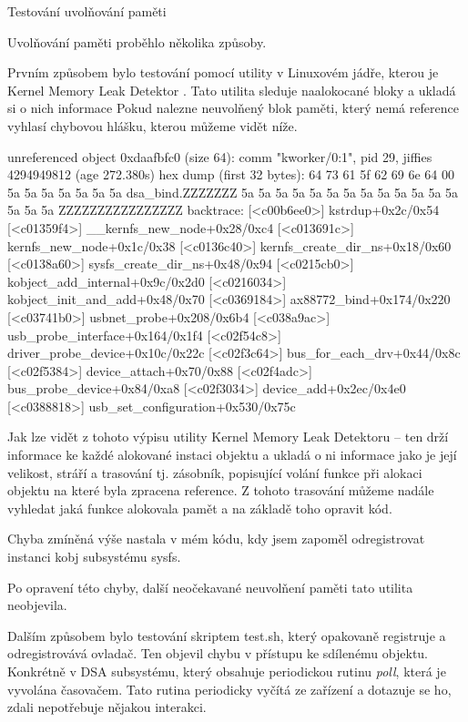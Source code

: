 \sec Testování uvolňování paměti

Uvolňování paměti proběhlo několika způsoby.

Prvním způsobem bylo testování pomocí utility v Linuxovém jádře, kterou je Kernel Memory Leak Detektor
.
Tato utilita sleduje naalokocané bloky a ukladá si o nich informace
Pokud nalezne neuvolňený blok paměti, který nemá reference vyhlasí chybovou hlášku, kterou můžeme vidět níže.

\begtt
unreferenced object 0xdaafbfc0 (size 64):
  comm "kworker/0:1", pid 29, jiffies 4294949812 (age 272.380s)
  hex dump (first 32 bytes):
    64 73 61 5f 62 69 6e 64 00 5a 5a 5a 5a 5a 5a 5a  dsa_bind.ZZZZZZZ
    5a 5a 5a 5a 5a 5a 5a 5a 5a 5a 5a 5a 5a 5a 5a 5a  ZZZZZZZZZZZZZZZZ
  backtrace:
    [<c00b6ee0>] kstrdup+0x2c/0x54
    [<c01359f4>] __kernfs_new_node+0x28/0xc4
    [<c013691c>] kernfs_new_node+0x1c/0x38
    [<c0136c40>] kernfs_create_dir_ns+0x18/0x60
    [<c0138a60>] sysfs_create_dir_ns+0x48/0x94
    [<c0215cb0>] kobject_add_internal+0x9c/0x2d0
    [<c0216034>] kobject_init_and_add+0x48/0x70
    [<c0369184>] ax88772_bind+0x174/0x220
    [<c03741b0>] usbnet_probe+0x208/0x6b4
    [<c038a9ac>] usb_probe_interface+0x164/0x1f4
    [<c02f54c8>] driver_probe_device+0x10c/0x22c
    [<c02f3c64>] bus_for_each_drv+0x44/0x8c
    [<c02f5384>] device_attach+0x70/0x88
    [<c02f4adc>] bus_probe_device+0x84/0xa8
    [<c02f3034>] device_add+0x2ec/0x4e0
    [<c0388818>] usb_set_configuration+0x530/0x75c
\endtt

Jak lze vidět z tohoto výpisu utility Kernel Memory Leak Detektoru -- ten drží informace ke každé alokované instaci objektu a ukladá o ni informace jako je její velikost, stráří a trasování tj. zásobník, popisující volání funkce při alokaci objektu na které byla zpracena reference.
Z tohoto trasování můžeme nadále vyhledat jaká funkce alokovala pamět a na základě toho opravit kód.

Chyba zmíněná výše nastala v mém kódu, kdy jsem zapoměl odregistrovat instanci kobj subsystému sysfs.

Po opravení této chyby, další neočekavané neuvolňení paměti tato utilita neobjevila.

Dalším způsobem bylo testování skriptem test.sh, který opakovaně registruje a odregistrovává ovladač.
Ten objevil chybu v přístupu ke sdílenému objektu.
Konkrétně v DSA subsystému, který obsahuje periodickou rutinu {\em poll}, která je vyvolána časovačem.
Tato rutina periodicky vyčítá ze zařízení a dotazuje se ho, zdali nepotřebuje nějakou interakci.

